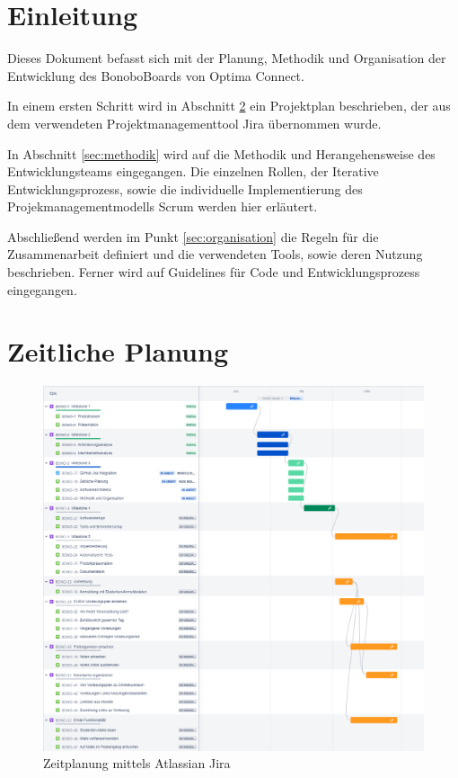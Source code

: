 \documentclass[a4paper,11pt]{scrartcl}
\begin{document}
\section{Einleitung}\label{sec:einleitung}
Dieses Dokument befasst sich mit der Planung, Methodik und Organisation der Entwicklung des BonoboBoards von Optima Connect.

In einem ersten Schritt wird in Abschnitt \ref{sec:zeitliche-planung} ein Projektplan beschrieben, der aus dem verwendeten Projektmanagementtool Jira übernommen wurde.

In Abschnitt \ref{sec:methodik} wird auf die Methodik und Herangehensweise des Entwicklungsteams eingegangen. Die einzelnen Rollen, der Iterative Entwicklungsprozess, sowie die individuelle Implementierung des Projekmanagementmodells Scrum werden hier erläutert.

Abschließend werden im Punkt \ref{sec:organisation} die Regeln für die Zusammenarbeit definiert und die verwendeten Tools, sowie deren Nutzung beschrieben. Ferner wird auf Guidelines für Code und Entwicklungsprozess eingegangen.

\section{Zeitliche Planung}\label{sec:zeitliche-planung}

  \begin{figure}[H]
\includegraphics[width=\textwidth]{timeplan}
\caption{Zeitplanung mittels Atlassian Jira}
\label{img:Zeitplanung}
\end{figure}
\end{document}
